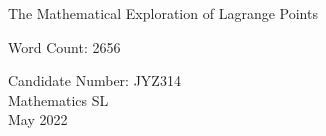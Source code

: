 \begin{titlepage}
	\begin{center}
		\vspace*{\fill}
		
		The Mathematical Exploration of Lagrange Points
		
		\vspace*{1.0cm}
		Word Count: 2656
		
		\vfill
		
		Candidate Number: JYZ314\\
		Mathematics SL \\
		May 2022
		
		\vspace*{\fill}
		
	\end{center}
\end{titlepage}
